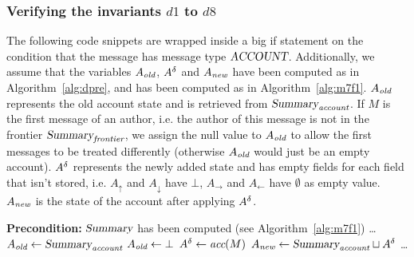 \documentclass{article}
\begin{document}
\subsubsection{Verifying the invariants \(d1\) to \(d8\)}
\label{sec:delta-invariant-checks}

The following code snippets are wrapped inside a big if statement on the condition that the message has message type $\textsl{ACCOUNT}$. Additionally, we assume that the variables $A_\emph{old}$, $A^\delta$ and $A_\emph{new}$ have been computed as in Algorithm~\ref{alg:dpre}, and  has been computed as in Algorithm~\ref{alg:m7f1}.
$A_\emph{old}$ represents the old account state and is retrieved from $\textsl{Summary}_\emph{account}$. If $M$ is the first message of an author, i.e. the author of this message is not in the frontier $\textsl{Summary}_\emph{frontier}$, we assign the null value to $A_\emph{old}$ to allow the first messages to be treated differently (otherwise $A_\emph{old}$ would just be an empty account).
$A^\delta$ represents the newly added state and has empty fields for each field that isn't stored, i.e. $A_\uparrow$ and $A_\downarrow$ have $\bot$, $A_\rightarrow$ and $A_\leftarrow$ have $\emptyset$ as empty value.
$A_\emph{new}$ is the state of the account after applying $A^\delta$.

\begin{algorithm}[ht]
    \caption{Code snippet assigning relevant account states}
    \label{alg:dpre}
\begin{algorithmic}
    \Statex \textbf{Precondition:} $\textsl{Summary}$ has been computed (see Algorithm~\ref{alg:m7f1})
    \Statex \ldots \vphantom{I}
        \State $A_\emph{old} \gets \textsl{Summary}_\emph{account}$
    \Else
        \State $A_\emph{old} \gets \bot$
    \EndIf
    \State $A^\delta \gets \textit{acc}(M)$
    \State $A_\emph{new} \gets \textsl{Summary}_\emph{account} \sqcup A^\delta$
    \Statex \ldots \vphantom{I}
\end{algorithmic}
\end{algorithm}
\end{document}
